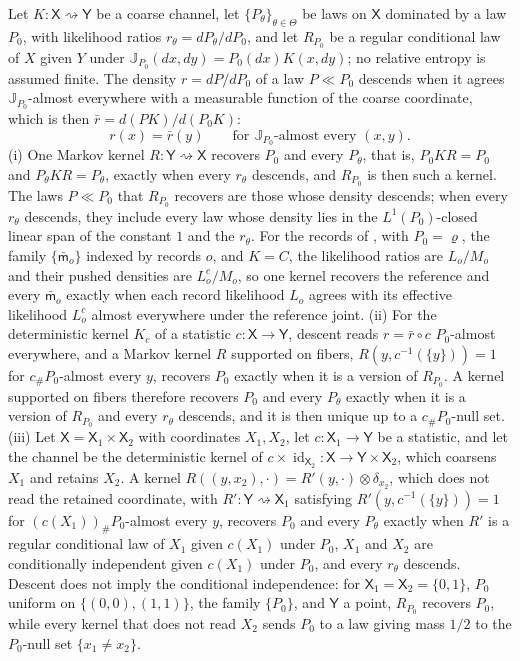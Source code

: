 Let $K:\mathsf X\rightsquigarrow\mathsf Y$ be a coarse channel, let $\{P_\theta\}_{\theta\in\Theta}$ be
laws on $\mathsf X$ dominated by a law $P_0$, with likelihood ratios $r_\theta=dP_\theta/dP_0$, and let
$R_{P_0}$ be a regular conditional law of $X$ given $Y$ under $\mathbb J_{P_0}(dx,dy)=P_0(dx)K(x,dy)$;
no relative entropy is assumed finite. The density $r=dP/dP_0$ of a law $P\ll P_0$ descends when it
agrees $\mathbb J_{P_0}$-almost everywhere with a measurable function of the coarse coordinate, which is
then $\bar r=d(PK)/d(P_0K)$:
\begin{equation}
r(x)=\bar r(y)\qquad\text{for }\mathbb J_{P_0}\text{-almost every }(x,y).
\label{eq:cg-likelihood-descent}
\end{equation}
(i) One Markov kernel $R:\mathsf Y\rightsquigarrow\mathsf X$ recovers $P_0$ and every $P_\theta$, that
is, $P_0KR=P_0$ and $P_\theta KR=P_\theta$, exactly when every $r_\theta$ descends, and $R_{P_0}$ is then
such a kernel. The laws $P\ll P_0$ that $R_{P_0}$ recovers are those whose density descends; when
every $r_\theta$ descends, they include every law whose density lies in the $L^1(P_0)$-closed linear
span of the constant $1$ and the $r_\theta$. For the records of , with $P_0=\varrho$, the family
$\{\bar{\mathsf m}_o\}$ indexed by records $o$, and $K=C$, the likelihood ratios are $L_o/M_o$ and
their pushed densities are $L^c_o/M_o$, so one kernel recovers the reference and every
$\bar{\mathsf m}_o$ exactly when each record likelihood $L_o$ agrees with its effective likelihood
$L^c_o$ almost everywhere under the reference joint. (ii) For the deterministic kernel $K_c$ of a
statistic $c:\mathsf X\to\mathsf Y$, descent reads $r=\bar r\circ c$ $P_0$-almost everywhere, and a
Markov kernel $R$ supported on fibers, $R(y,c^{-1}(\{y\}))=1$ for $c_\#P_0$-almost every $y$, recovers
$P_0$ exactly when it is a version of $R_{P_0}$. A kernel supported on fibers therefore recovers $P_0$
and every $P_\theta$ exactly when it is a version of $R_{P_0}$ and every $r_\theta$ descends, and it is
then unique up to a $c_\#P_0$-null set. (iii) Let $\mathsf X=\mathsf X_1\times\mathsf X_2$ with
coordinates $X_1,X_2$, let $c:\mathsf X_1\to\mathsf Y$ be a statistic, and let the channel be the
deterministic kernel of $c\times\operatorname{id}_{\mathsf X_2}:\mathsf X\to\mathsf Y\times\mathsf X_2$,
which coarsens $X_1$ and retains $X_2$. A kernel $R((y,x_2),\cdot)=R'(y,\cdot)\otimes\delta_{x_2}$, which
does not read the retained coordinate, with $R':\mathsf Y\rightsquigarrow\mathsf X_1$ satisfying
$R'(y,c^{-1}(\{y\}))=1$ for $(c(X_1))_\#P_0$-almost every $y$, recovers $P_0$ and every $P_\theta$ exactly when $R'$ is a regular conditional law of
$X_1$ given $c(X_1)$ under $P_0$, $X_1$ and $X_2$ are conditionally independent given $c(X_1)$ under
$P_0$, and every $r_\theta$ descends. Descent does not imply the conditional independence: for
$\mathsf X_1=\mathsf X_2=\{0,1\}$, $P_0$ uniform on $\{(0,0),(1,1)\}$, the family $\{P_0\}$, and
$\mathsf Y$ a point, $R_{P_0}$ recovers $P_0$, while every kernel that does not read $X_2$ sends $P_0$ to
a law giving mass $1/2$ to the $P_0$-null set $\{x_1\neq x_2\}$. 


